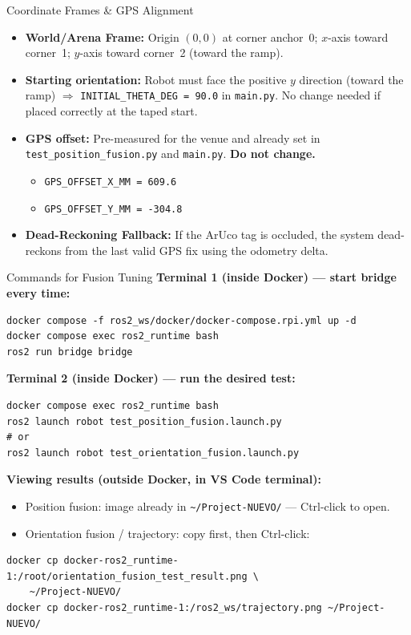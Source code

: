 \documentclass{beamer}
\begin{document}
\begin{frame}{Coordinate Frames \& GPS Alignment}
    \begin{itemize}
        \item \textbf{World/Arena Frame:} Origin $(0,0)$ at corner anchor~0; $x$-axis toward corner~1; $y$-axis toward corner~2 (toward the ramp).
        \item \textbf{Starting orientation:} Robot must face the positive $y$ direction (toward the ramp) $\Rightarrow$ \texttt{INITIAL\_THETA\_DEG = 90.0} in \texttt{main.py}.  No change needed if placed correctly at the taped start.
        \item \textbf{GPS offset:} Pre-measured for the venue and already set in \texttt{test\_position\_fusion.py} and \texttt{main.py}. \textbf{Do not change.}
        \begin{itemize}
            \item \texttt{GPS\_OFFSET\_X\_MM = 609.6}
            \item \texttt{GPS\_OFFSET\_Y\_MM = -304.8}
        \end{itemize}
        \item \textbf{Dead-Reckoning Fallback:} If the ArUco tag is occluded, the system dead-reckons from the last valid GPS fix using the odometry delta.
    \end{itemize}
\end{frame}

\begin{frame}[fragile]{Commands for Fusion Tuning}
    \textbf{Terminal 1 (inside Docker) --- start bridge every time:}
    \begin{verbatim}
docker compose -f ros2_ws/docker/docker-compose.rpi.yml up -d
docker compose exec ros2_runtime bash
ros2 run bridge bridge
    \end{verbatim}

    \textbf{Terminal 2 (inside Docker) --- run the desired test:}
    \begin{verbatim}
docker compose exec ros2_runtime bash
ros2 launch robot test_position_fusion.launch.py
# or
ros2 launch robot test_orientation_fusion.launch.py
    \end{verbatim}

    \textbf{Viewing results (outside Docker, in VS Code terminal):}
    \begin{itemize}
        \item Position fusion: image already in \texttt{\textasciitilde/Project-NUEVO/} --- Ctrl-click to open.
        \item Orientation fusion / trajectory: copy first, then Ctrl-click:
    \end{itemize}
    \begin{verbatim}
docker cp docker-ros2_runtime-1:/root/orientation_fusion_test_result.png \
    ~/Project-NUEVO/
docker cp docker-ros2_runtime-1:/ros2_ws/trajectory.png ~/Project-NUEVO/
    \end{verbatim}
\end{frame}
\end{document}
